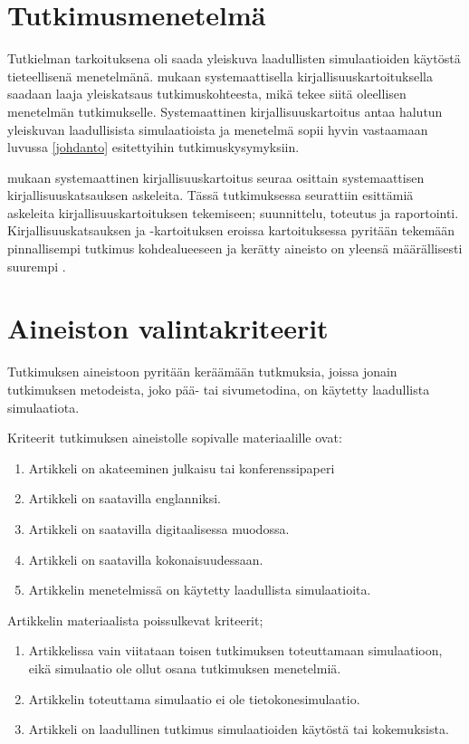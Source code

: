 \documentclass[utf8]{gradu3}
\begin{document}
\section{Tutkimusmenetelmä} \label{tutkimusmenetelmä}
Tutkielman tarkoituksena oli saada yleiskuva laadullisten simulaatioiden käytöstä
tieteellisenä menetelmänä.
\textcite{keele2007guidelines} mukaan  systemaattisella kirjallisuuskartoituksella saadaan laaja yleiskatsaus tutkimuskohteesta,
mikä tekee siitä oleellisen menetelmän tutkimukselle. 
Systemaattinen kirjallisuuskartoitus antaa halutun yleiskuvan laadullisista simulaatioista ja menetelmä sopii hyvin vastaamaan luvussa \ref{johdanto} esitettyihin tutkimuskysymyksiin.

\textcite{keele2007guidelines} mukaan systemaattinen kirjallisuuskartoitus seuraa
osittain systemaattisen kirjallisuuskatsauksen askeleita.
Tässä tutkimuksessa seurattiin \textcite{keele2007guidelines} esittämiä askeleita kirjallisuuskartoituksen tekemiseen; suunnittelu, toteutus ja raportointi.
Kirjallisuuskatsauksen ja -kartoituksen eroissa kartoituksessa pyritään tekemään 
pinnallisempi tutkimus kohdealueeseen ja kerätty aineisto on 
yleensä määrällisesti suurempi \parencite{keele2007guidelines}.

\section{Aineiston valintakriteerit} \label{valintakriteerit}
Tutkimuksen aineistoon pyritään keräämään tutkmuksia, joissa jonain tutkimuksen metodeista, joko pää- tai sivumetodina, on käytetty laadullista simulaatiota.

Kriteerit tutkimuksen aineistolle sopivalle materiaalille ovat:
\begin{enumerate}
    \item Artikkeli on akateeminen julkaisu tai konferenssipaperi
    \item Artikkeli on saatavilla englanniksi.
    \item Artikkeli on saatavilla digitaalisessa muodossa.
    \item Artikkeli on saatavilla kokonaisuudessaan.
    \item Artikkelin menetelmissä on käytetty laadullista simulaatioita.
\end{enumerate}

Artikkelin materiaalista poissulkevat kriteerit;
\begin{enumerate}
    \item Artikkelissa vain viitataan toisen tutkimuksen toteuttamaan simulaatioon, eikä simulaatio ole ollut osana tutkimuksen menetelmiä.
    \item Artikkelin toteuttama simulaatio ei ole tietokonesimulaatio.
    \item Artikkeli on laadullinen tutkimus simulaatioiden käytöstä tai kokemuksista.
\end{enumerate}
\end{document}
